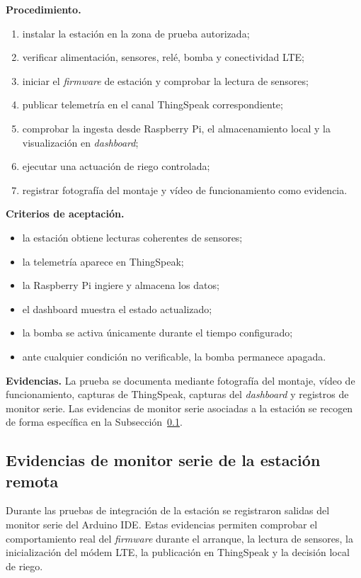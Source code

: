 \textbf{Procedimiento.}
\begin{enumerate}
    \item instalar la estación en la zona de prueba autorizada;
    \item verificar alimentación, sensores, relé, bomba y conectividad LTE;
    \item iniciar el \textit{firmware} de estación y comprobar la lectura de sensores;
    \item publicar telemetría en el canal ThingSpeak correspondiente;
    \item comprobar la ingesta desde Raspberry Pi, el almacenamiento local y la visualización en \textit{dashboard};
    \item ejecutar una actuación de riego controlada;
    \item registrar fotografía del montaje y vídeo de funcionamiento como evidencia.
\end{enumerate}

\textbf{Criterios de aceptación.}
\begin{itemize}
    \item la estación obtiene lecturas coherentes de sensores;
    \item la telemetría aparece en ThingSpeak;
    \item la Raspberry Pi ingiere y almacena los datos;
    \item el dashboard muestra el estado actualizado;
    \item la bomba se activa únicamente durante el tiempo configurado;
    \item ante cualquier condición no verificable, la bomba permanece apagada.
\end{itemize}

\textbf{Evidencias.} La prueba se documenta mediante fotografía del montaje, vídeo de funcionamiento, capturas de ThingSpeak, capturas del \textit{dashboard} y registros de monitor serie. Las evidencias de monitor serie asociadas a la estación se recogen de forma específica en la Subsección~\ref{subsec:evidencias_monitor_serie_pruebas}.

\subsection{Evidencias de monitor serie de la estación remota}
\label{subsec:evidencias_monitor_serie_pruebas}

Durante las pruebas de integración de la estación se registraron salidas del monitor serie del Arduino IDE. Estas evidencias permiten comprobar el comportamiento real del \textit{firmware} durante el arranque, la lectura de sensores, la inicialización del módem LTE, la publicación en ThingSpeak y la decisión local de riego.

